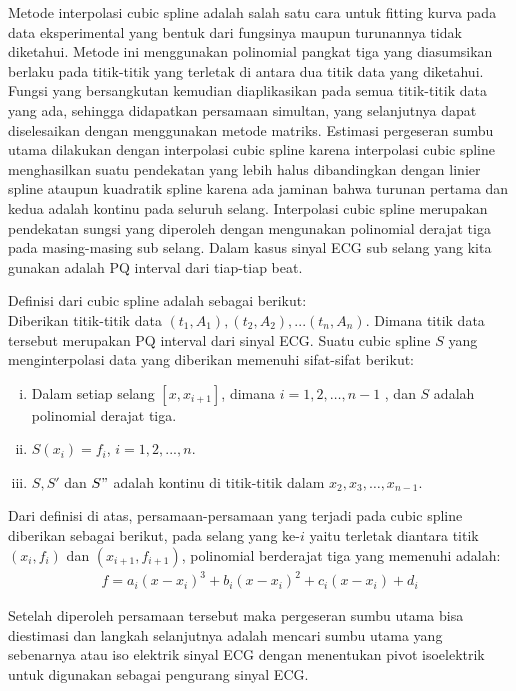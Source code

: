 Metode interpolasi cubic spline adalah salah satu cara untuk fitting kurva pada
data eksperimental yang bentuk dari fungsinya maupun turunannya tidak diketahui.
Metode ini menggunakan polinomial pangkat tiga yang diasumsikan berlaku pada
titik-titik yang terletak di antara dua titik data yang diketahui. Fungsi yang
bersangkutan kemudian diaplikasikan pada semua titik-titik data yang ada,
sehingga didapatkan persamaan simultan, yang selanjutnya dapat diselesaikan
dengan menggunakan metode matriks. Estimasi pergeseran sumbu utama dilakukan
dengan interpolasi cubic spline karena interpolasi cubic spline menghasilkan
suatu pendekatan yang lebih halus dibandingkan dengan linier spline ataupun
kuadratik spline karena ada jaminan bahwa turunan pertama dan kedua adalah
kontinu pada seluruh selang. Interpolasi cubic spline merupakan pendekatan
sungsi yang diperoleh dengan mengunakan polinomial derajat tiga pada
masing-masing sub selang. Dalam kasus sinyal ECG sub selang yang kita gunakan
adalah PQ interval dari tiap-tiap beat.
 
\noindent Definisi dari cubic spline adalah sebagai berikut: \\
Diberikan titik-titik data $(t_1, A_1), (t_2, A_2),...(t_n, A_n)$. Dimana
titik data tersebut merupakan PQ interval dari sinyal ECG. Suatu cubic spline
$S$ yang menginterpolasi data yang diberikan memenuhi sifat-sifat berikut: 
\begin{enumerate}[(i)] 
  \item Dalam setiap selang $[x, x_{i+1}]$, dimana $i=1, 2, \dots, n-1$ , dan
  $S$ adalah polinomial derajat tiga. 
  \item $S(x_i)=f_i$, $i=1,2,...,n.$ 
  \item $S, S'$ dan $S"$ adalah kontinu di titik-titik dalam $x_2, x_3, \dots,
  x_{n-1}$.
\end{enumerate}
 
Dari definisi di atas, persamaan-persamaan yang terjadi pada cubic spline
diberikan sebagai berikut, pada selang yang ke-$i$ yaitu terletak diantara titik
$(x_i, f_i)$ dan $(x_{i+1}, f_{i+1})$, polinomial berderajat tiga yang memenuhi
adalah: 
\begin{align}
	\label{eq:polybwr}
	f = a_i(x-x_i)^3 + b_i(x-x_i)^2 + c_i(x-x_i) + d_i
\end{align}

Setelah diperoleh persamaan tersebut maka pergeseran sumbu utama bisa diestimasi
dan langkah selanjutnya adalah mencari sumbu utama yang sebenarnya atau iso
elektrik sinyal ECG dengan menentukan pivot isoelektrik untuk digunakan sebagai
pengurang sinyal ECG. 

